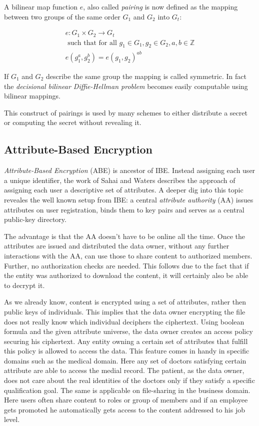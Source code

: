 A bilinear map function $e$, also called \textit{pairing} is now defined as the mapping between two groups of the same order $G_1$ and $G_2$ into $G_t$:

\begin{gather*}
 e : G_1 \times G_2 \rightarrow G_t \\
\text{ such that for all } g_1 \in G_1, g_2 \in G_2, a, b \in \mathbb{Z} \\
e(g_1^a, g_2^b) = e(g_1, g_2)^{ab} 
\end{gather*}

If $G_1$ and $G_2$ describe the same group the mapping is called symmetric. In fact the \textit{decisional bilinear Diffie-Hellman problem} becomes easily computable using bilinear mappings. \cite{bethencourt2015intro}

This construct of pairings is used by many schemes to either distribute a secret or computing the secret without revealing it.

\subsection{Attribute-Based Encryption}
\textit{Attribute-Based Encryption} (\ac{ABE}) is ancestor of IBE. Instead assigning each user a unique identifier, the work of Sahai and Waters \cite{sahai2005fuzzy} describes the approach of assigning each user a descriptive set of attributes. A deeper dig into this topic reveales the well known setup from \ac{IBE}: a central \textit{attribute authority} (\ac{AA}) issues attributes on user registration, binds them to key pairs and serves as a central public-key directory. 

The advantage is that the \ac{AA} doesn't have to be online all the time. Once the attributes are issued and distributed the data owner, without any further interactions with the \ac{AA}, can use those to share content to authorized members. Further, no authorization checks are needed. This follows due to the fact that if the entity was authorized to download the content, it will certainly also be able to decrypt it. 

As we already know, content is encrypted using a set of attributes, rather then public keys of individuals. This implies that the data owner encrypting the file does not really know which individual deciphers the ciphertext. Using boolean formula and the given attribute universe, the data owner creates an access policy securing his ciphertext. Any entity owning a certain set of attributes that fulfill this policy is allowed to access the data. This feature comes in handy in specific domains such as the medical domain. Here any set of doctors satisfying certain attribute are able to access the medial record. The patient, as the data owner, does not care about the real identities of the doctors only if they satisfy a specific qualification goal. The same is applicable on file-sharing in the business domain. Here users often share content to roles or group of members and if an employee gets promoted he automatically gets access to the content addressed to his job level. 

